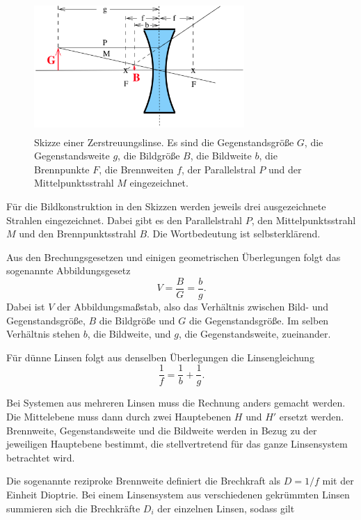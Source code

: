 \begin{figure}
    \centering
    \includegraphics[width=8cm, height=5cm]{build/streulinse.png}
    \caption{Skizze einer Zerstreuungslinse. Es sind die Gegenstandsgröße $G$, die Gegenstandsweite $g$, die Bildgröße $B$, die Bildweite $b$, die Brennpunkte $F$, die Brennweiten $f$, der Parallelstral $P$ und der Mittelpunktsstrahl $M$ eingezeichnet. \cite{V408}}
    \label{streulinse}
\end{figure}

\noindent Für die Bildkonstruktion in den Skizzen werden jeweils drei ausgezeichnete Strahlen eingezeichnet. Dabei gibt es den Parallelstrahl $P$, den Mittelpunktsstrahl $M$ und den Brennpunktsstrahl $B$. Die Wortbedeutung ist selbsterklärend.

\noindent Aus den Brechungsgesetzen und einigen geometrischen Überlegungen folgt das sogenannte Abbildungsgesetz
\begin{equation}
    V = \frac{B}{G} = \frac{b}{g}.
    \label{eqn:abbildungsgesetz}
\end{equation}
\noindent Dabei ist $V$ der Abbildungsmaßstab, also das Verhältnis zwischen Bild- und Gegenstandsgröße, $B$ die Bildgröße und $G$ die Gegenstandsgröße. Im selben Verhältnis stehen $b$, die Bildweite, und $g$, die Gegenstandsweite, zueinander. 

\noindent Für dünne Linsen folgt aus denselben Überlegungen die Linsengleichung 
\begin{equation}
    \frac{1}{f}= \frac{1}{b} + \frac{1}{g}.
    \label{eqn:linsengleichung}
\end{equation}

\noindent Bei Systemen aus mehreren Linsen muss die Rechnung anders gemacht werden. 
Die Mittelebene muss dann durch zwei Hauptebenen $H$ und $H'$ ersetzt werden.
Brennweite, Gegenstandsweite und die Bildweite werden in Bezug zu der jeweiligen Hauptebene bestimmt, die stellvertretend für das ganze Linsensystem betrachtet wird. 

\noindent Die sogenannte reziproke Brennweite definiert die Brechkraft als $D= 1/f$ mit der Einheit Dioptrie. Bei einem Linsensystem aus verschiedenen gekrümmten Linsen summieren sich die Brechkräfte $D_i$ der einzelnen Linsen, sodass gilt 

